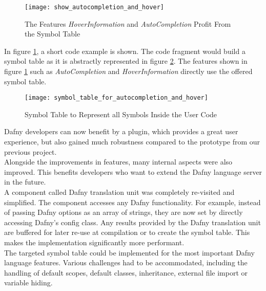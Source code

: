 \begin{figure}[H]
    \centering
    \texttt{[image: show\_autocompletion\_and\_hover]}
    \caption{The Features \textit{HoverInformation} and \textit{AutoCompletion} Profit From the Symbol Table}
    \label{fig:show_autocompletion_and_hover}
\end{figure}

In figure \ref{fig:show_autocompletion_and_hover}, a short code example is shown.
The code fragment would build a symbol table as it is abstractly represented in figure \ref{fig:symbol_table_for_autocompletion_and_hover}.
The features shown in figure \ref{fig:show_autocompletion_and_hover} such as \textit{AutoCompletion} and \textit{HoverInformation} directly use the offered symbol table.

\begin{figure}[H]
    \centering
    \texttt{[image: symbol\_table\_for\_autocompletion\_and\_hover]}
    \caption{Symbol Table to Represent all Symbols Inside the User Code}
    \label{fig:symbol_table_for_autocompletion_and_hover}
\end{figure}

Dafny developers can now benefit by a plugin, which provides a great user experience,
but also gained much robustness compared to the prototype from our previous project.\\

Alongside the improvements in features, many internal aspects were also improved.
This benefits developers who want to extend the Dafny language server in the future.\\

A component called Dafny translation unit was completely re-visited and simplified.
The component accesses any Dafny functionality.
For example, instead of passing Dafny options as an array of strings, they are now set by
directly accessing Dafny's config class.
Any results provided by the Dafny translation unit are buffered for later re-use at compilation or to create the symbol table.
This makes the implementation significantly more performant.\\

The targeted symbol table could be implemented for the most important Dafny language features.
Various challenges had to be accommodated, including the handling of default scopes, default classes, inheritance, external file import or variable hiding.\\

